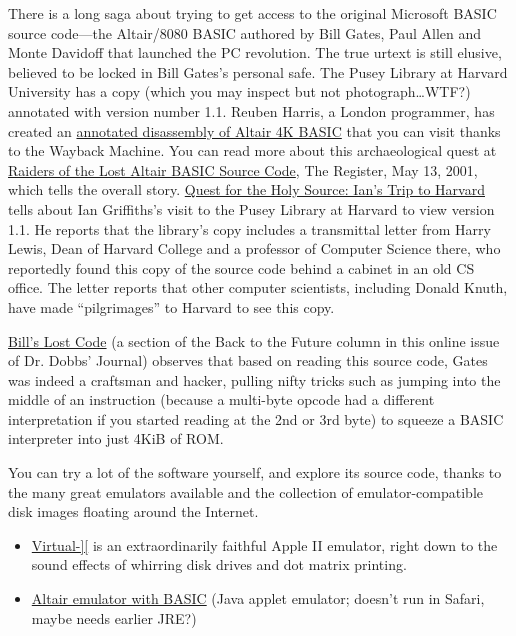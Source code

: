 \documentclass{article}
\begin{document}


There is a long saga about trying to get access to the original
Microsoft BASIC source code---the Altair/8080 BASIC authored by Bill
Gates, Paul Allen and Monte Davidoff that launched the PC revolution.
The true urtext is still elusive, believed to be locked in Bill Gates's
personal safe.
The Pusey Library at Harvard University has a copy (which you may
inspect but not photograph\ldots{}WTF?) annotated with version number
1.1.
Reuben Harris, a London programmer, has created an
\href{http://web.archive.org/web/20011211233332/www.rjh.org.uk/altair/4k/index2.html}{annotated
disassembly of Altair 4K BASIC} that you can visit thanks to the
Wayback Machine.
You can read more about this archaeological quest at
\href{http://www.theregister.co.uk/2001/05/13/raiders_of_the_lost_altair/}{Raiders
of the Lost Altair BASIC Source Code}, The Register, May 13, 2001,
which tells the overall story.
\href{http://www.interact-sw.co.uk/altair/other\%20versions/ian.htm}{Quest
for the Holy Source: Ian's Trip to Harvard} tells about Ian
Griffiths's visit to the Pusey Library at Harvard to view version
1.1.
He reports that the library's copy includes a transmittal letter from
Harry Lewis, Dean of Harvard College and a professor of Computer
Science there, who reportedly found this copy of the source code behind
a cabinet in an old CS office.
The letter reports that other computer scientists, including Donald
Knuth, have made ``pilgrimages'' to Harvard to see this copy.

\href{http://www.drdobbs.com/back-to-the-future/184404733}{Bill's
  Lost Code} (a section of the Back to the Future column in this online
issue of Dr. Dobbs' Journal) observes that based on reading this source
code, Gates was indeed a craftsman and hacker, pulling nifty tricks such
as jumping into the middle of an instruction (because a multi-byte
opcode had a different interpretation if you started reading at the 2nd
or 3rd byte) to squeeze a BASIC interpreter into just 4KiB of ROM.

You can try a lot of the software yourself, and explore
its source code, thanks to the many great emulators available and the
collection of emulator-compatible disk images floating around the Internet.

\begin{itemize}
\item \href{http://virtualii.com}{Virtual-][} is an extraordinarily
  faithful Apple II emulator, right down to the sound effects of
  whirring disk drives and dot matrix printing.

\item \href{http://web.archive.org/web/20011211231432/http://www.rjh.org.uk/altair/4k/em/altem.htm}{Altair emulator with BASIC} (Java applet emulator; doesn't run in Safari,
maybe needs earlier JRE?)

\end{itemize}
\end{document}
